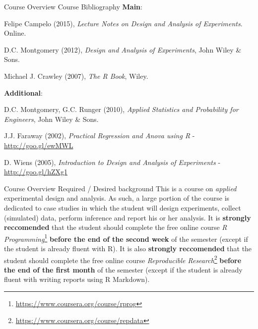 \documentclass[t]{beamer}
\begin{document}

\begin{ftst}
{Course Overview}
{Course Bibliography}
\textbf{Main}:\\
{\footnotesize
\bitems Felipe Campelo (2015), \textit{Lecture Notes on Design and Analysis of Experiments}. Online.\\
\item D.C. Montgomery (2012), \textit{Design and Analysis of Experiments}, John Wiley \& Sons.
\item Michael J. Crawley (2007), \textit{The R Book}, Wiley.
\eitem}
\vhalf
\textbf{Additional}:
{\footnotesize\bitems D.C. Montgomery, G.C. Runger (2010), \textit{Applied Statistics and Probability for Engineers}, John Wiley \& Sons.
\item J.J. Faraway (2002), \textit{Practical Regression and Anova using R} - {\small\url{http://goo.gl/ewMWL}}
\item D. Wiens (2005), \textit{Introduction to Design and Analysis of Experiments} - {\small\url{http://goo.gl/hZXg1}}
\eitem}
\end{ftst}


\begin{ftst}
{Course Overview}
{Required / Desired background}
This is a course on \textit{applied} experimental design and analysis. As such, a large portion of the course is dedicated to case studies in which the student will design experiments, collect (simulated) data, perform inference and report his or her analysis.
\vone
It is \textbf{strongly reccomended} that the student should complete the free online course  \textit{R Programming}\footnote{{\scriptsize\url{https://www.coursera.org/course/rprog}}} \textbf{before the end of the second week} of the semester (except if the student is already fluent with R).
\vone
It is also \textbf{strongly reccomended} that the student should complete the free online course  \textit{Reproducible Research}\footnote{{\scriptsize\url{https://www.coursera.org/course/repdata}}} \textbf{before the end of the first month} of the semester (except if the student is already fluent with writing reports using R Markdown).
\end{ftst}

\end{document}
